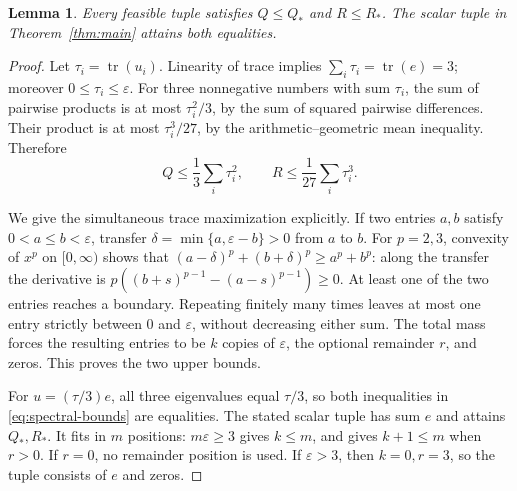 \documentclass[11pt]{article}
\newtheorem{lemma}[theorem]{Lemma}
\newcommand{\tr}{\operatorname{tr}}
\begin{document}
\begin{lemma}\label{lem:bounds}
Every feasible tuple satisfies \(Q\leq Q_*\) and \(R\leq R_*\).
The scalar tuple in Theorem~\ref{thm:main} attains both equalities.
\end{lemma}
\begin{proof}
Let \(\tau_i=\tr(u_i)\). Linearity of trace implies
\(\sum_i\tau_i=\tr(e)=3\); moreover \(0\leq\tau_i\leq\varepsilon\).
For three nonnegative numbers with sum \(\tau_i\), the sum of pairwise
products is at most \(\tau_i^2/3\), by the sum of squared pairwise
differences. Their product is at most \(\tau_i^3/27\), by the
arithmetic--geometric mean inequality. Therefore
\begin{equation}\label{eq:spectral-bounds}
 Q\leq\frac13\sum_i\tau_i^2,\qquad
 R\leq\frac1{27}\sum_i\tau_i^3.
\end{equation}

We give the simultaneous trace maximization explicitly. If two entries
\(a,b\) satisfy \(0<a\leq b<\varepsilon\), transfer
\(\delta=\min\{a,\varepsilon-b\}>0\) from \(a\) to \(b\).
For \(p=2,3\), convexity of \(x^p\) on \([0,\infty)\) shows that
\((a-\delta)^p+(b+\delta)^p\geq a^p+b^p\): along the transfer the
derivative is \(p((b+s)^{p-1}-(a-s)^{p-1})\geq0\).
At least one of the two entries reaches a boundary. Repeating finitely
many times leaves at most one entry strictly between \(0\) and
\(\varepsilon\), without decreasing either sum. The total mass forces
the resulting entries to be \(k\) copies of \(\varepsilon\), the
optional remainder \(r\), and zeros. This proves the two upper bounds.

For \(u=(\tau/3)e\), all three eigenvalues equal \(\tau/3\), so both
inequalities in \eqref{eq:spectral-bounds} are equalities. The stated
scalar tuple has sum \(e\) and attains \(Q_*,R_*\).
It fits in \(m\) positions: \(m\varepsilon\geq3\) gives \(k\leq m\),
and gives \(k+1\leq m\) when \(r>0\). If \(r=0\), no remainder
position is used. If \(\varepsilon>3\), then \(k=0,r=3\), so the tuple
consists of \(e\) and zeros.
\end{proof}
\end{document}
